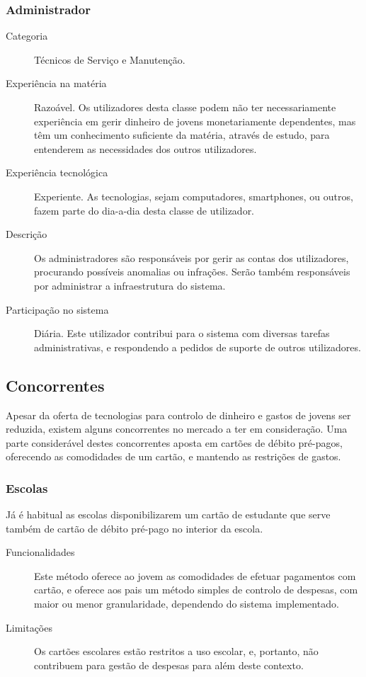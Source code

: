 \documentclass[12pt,a4paper]{article}
\begin{document}
    \subsubsection{Administrador}

      \begin{description}
        \item[Categoria]Técnicos de Serviço e Manutenção.
        \item[Experiência na matéria]Razoável. Os utilizadores desta classe podem não ter necessariamente experiência em gerir dinheiro de jovens monetariamente dependentes, mas têm um conhecimento suficiente da matéria, através de estudo, para entenderem as necessidades dos outros utilizadores.
        \item[Experiência tecnológica]Experiente. As tecnologias, sejam computadores, smartphones, ou outros, fazem parte do dia-a-dia desta classe de utilizador.
        \item[Descrição]Os administradores são responsáveis por gerir as contas dos utilizadores, procurando possíveis anomalias ou infrações. Serão também responsáveis por administrar a infraestrutura do sistema.
        \item[Participação no sistema]Diária. Este utilizador contribui para o sistema com diversas tarefas administrativas, e respondendo a pedidos de suporte de outros utilizadores.   
      \end{description}

  \subsection{Concorrentes}

    Apesar da oferta de tecnologias para controlo de dinheiro e gastos de jovens ser reduzida, existem alguns concorrentes no mercado a ter em consideração. Uma parte considerável destes concorrentes aposta em cartões de débito pré-pagos, oferecendo as comodidades de um cartão, e mantendo as restrições de gastos.

    \subsubsection{Escolas}

      Já é habitual as escolas disponibilizarem um cartão de estudante que serve também de cartão de débito pré-pago no interior da escola.

      \begin{description}
        \item[Funcionalidades] Este método oferece ao jovem as comodidades de efetuar pagamentos com cartão, e oferece aos pais um método simples de controlo de despesas, com maior ou menor granularidade, dependendo do sistema implementado.

        \item[Limitações] Os cartões escolares estão restritos a uso escolar, e, portanto, não contribuem para gestão de despesas para além deste contexto.
      \end{description}
\end{document}
